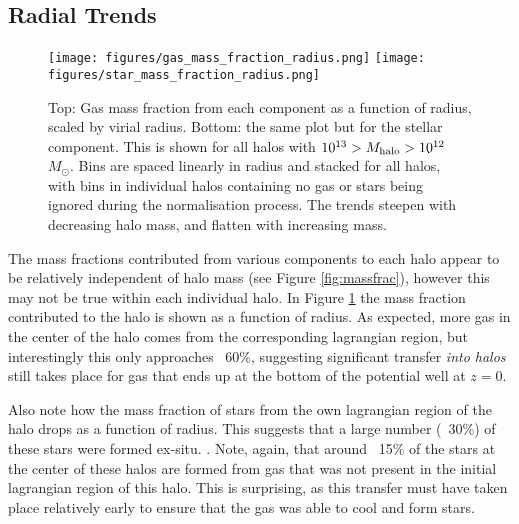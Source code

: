 \subsection{Radial Trends}

\begin{figure}
    \centering
    \texttt{[image: figures/gas\_mass\_fraction\_radius.png]}
    \texttt{[image: figures/star\_mass\_fraction\_radius.png]}
    \caption{Top: Gas mass fraction from each component as a function of radius, scaled by virial radius. Bottom: the same plot but for the stellar component. This is shown for all halos with $10^{13} > M_{\rm halo} > 10^{12}$ $M_\odot$. Bins are spaced linearly in radius and stacked for all halos, with bins in individual halos containing no gas or stars being ignored during the normalisation process. The trends steepen with decreasing halo mass, and flatten with increasing mass.}
    \label{fig:radialmassfrac}
\end{figure}

The mass fractions contributed from various components to each halo appear to be relatively independent of halo mass (see Figure \ref{fig:massfrac}), however this may not be true within each individual halo. In Figure \ref{fig:radialmassfrac} the mass fraction contributed to the halo is shown as a function of radius. As expected, more gas in the center of the halo comes from the corresponding lagrangian region, but interestingly this only approaches ~60\%, suggesting significant transfer \emph{into halos} still takes place for gas that ends up at the bottom of the potential well at $z=0$.

Also note how the mass fraction of stars from the own lagrangian region of the halo drops as a function of radius. This suggests that a large number (~30\%) of these stars were formed ex-situ. . Note, again, that around ~15\% of the stars at the center of these halos are formed from gas that was not present in the initial lagrangian region of this halo. This is surprising, as this transfer must have taken place relatively early to ensure that the gas was able to cool and form stars.

